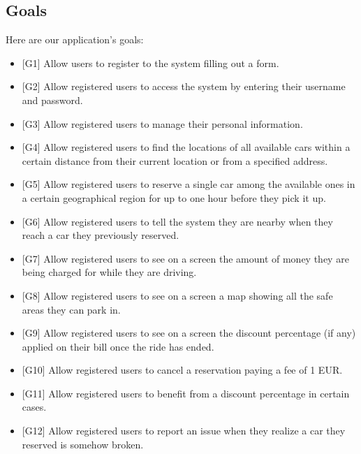 \subsection{Goals}
\label{Goals}
Here are our application's goals:
\begin{itemize}
	\item {[G1]} Allow users to register to the system filling out a form. 
	\item {[G2]} Allow registered users to access the system by entering their username and password.
	\item {[G3]} Allow registered users to manage their personal information.
	\item {[G4]} Allow registered users to find the locations of all available cars within a certain distance from their current location or from a specified address.
	\item {[G5]} Allow registered users to reserve a single car among the available ones in a certain geographical region for up to one hour before they pick it up.
	\item {[G6]} Allow registered users to tell the system they are nearby when they reach a car they previously reserved.
	\item {[G7]} Allow registered users to see on a screen the amount of money they are being charged for while they are driving. 
	\item {[G8]} Allow registered users to see on a screen a map showing all the safe areas they can park in. 
	\item {[G9]} Allow registered users to see on a screen the discount percentage (if any) applied on their bill once the ride has ended.
	\item {[G10]} Allow registered users to cancel a reservation paying a fee of 1 EUR.
	\item {[G11]} Allow registered users to benefit from a discount percentage in certain cases.
	\item {[G12]} Allow registered users to report an issue when they realize a car they reserved is somehow broken.
\end{itemize}
\newpage
